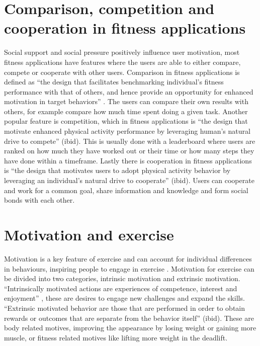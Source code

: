 \section{Comparison, competition and cooperation in fitness applications}
 Social support and social pressure positively influence user motivation\cite{Buis2009}, most fitness applications have features where the users are able to either compare, compete or cooperate with other users. Comparison in fitness applications is defined as “the design that facilitates benchmarking individual’s fitness performance with that of others, and hence provide an opportunity for enhanced motivation in target behaviors” \cite{Yoganathan2013}. The users can compare their own results with others, for example compare how much time spent doing a given task. Another popular feature is competition, which in fitness applications is “the design that motivate enhanced physical activity performance by leveraging human’s natural drive to compete” (ibid). This is usually done with a leaderboard where users are ranked on how much they have worked out or their time or how many steps they have done within a timeframe.  Lastly there is cooperation in fitness applications is “the design that motivates users to adopt physical activity behavior by leveraging an individual’s natural drive to cooperate” (ibid). Users can cooperate and work for a common goal, share information and knowledge and form social bonds with each other.

\section{Motivation and exercise}
Motivation is a key feature of exercise and can account for individual differences in behaviours, inspiring people to engage in exercise \cite{Patel2015}.
Motivation for exercise can be divided into two categories, intrinsic motivation and extrinsic motivation. “Intrinsically motivated actions are experiences of competence, interest and enjoyment” \cite{Richard}, these are desires to engage new challenges and expand the skills.  “Extrinsic motivated behavior are those that are performed in order to obtain rewards or outcomes that are separate from the behavior itself” (ibid). These are body related motives, improving the appearance by losing weight or gaining more muscle, or fitness related motives like lifting more weight in the deadlift.  

